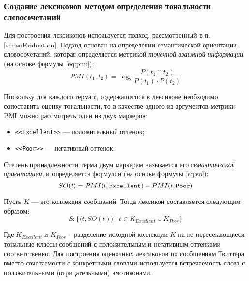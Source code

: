     \lstset{style=python}
    


    \subsubsection{Создание лексиконов методом определения тональности словосочетаний}
    Для построения лексиконов используется подход, рассмотренный в п.
    \ref{sec:soEvaluation}.
    Подход основан на определении семантической ориентации словосочетаний, которая
    определяется метрикой {\it точечной взаимной информации} (на основе формулы
    \ref{eq:pmi}):
    \begin{equation}
        \label{eq:pmi2}
        PMI(t_1, t_2) = \log_2 \dfrac{P(t_1 \cap t_2)}{P(t_1) \cdot P(t_2)}
    \end{equation}

    Поскольку для каждого терма $t$, содержащегося в лексиконе необходимо
    сопоставить оценку тональности, то в качестве одного из аргументов метрики
    PMI можно рассмотреть один из двух маркеров:
    \begin{itemize}
        \item {\tt <<Excellent>>} --- положительный оттенок;
        \item {\tt <<Poor>>} --- негативный оттенок.
    \end{itemize}

    Степень принадлежности терма двум маркерам называется его {\it семантической
    ориентацией}, и определяется формулой (на основе формулы \ref{eq:so}):
    \begin{equation}
        SO(t) = PMI(t, {\tt Excellent}) - PMI(t, {\tt Poor})
    \end{equation}

    Пусть $K$ --- это коллекция сообщений. Тогда лексикон составляется следующим
    образом:
    \begin{equation}
        S : \{\langle t, SO(t) \rangle \hspace{2pt}| \hspace{4pt} t \in K_{Excellent} \cup K_{Poor}\}
    \end{equation}

    Где $K_{Excellent}$ и $K_{Poor}$ – разделение исходной коллекции $K$ на
    не пересекающиеся тональные классы сообщений с положительным и негативным
    оттенками соответственно.  Для построения оценочных лексиконов по сообщениям
    Твиттера вместо сочетаемости с конкретными словами используется встречаемость
    слова с положительными (отрицательными) эмотиконами.


